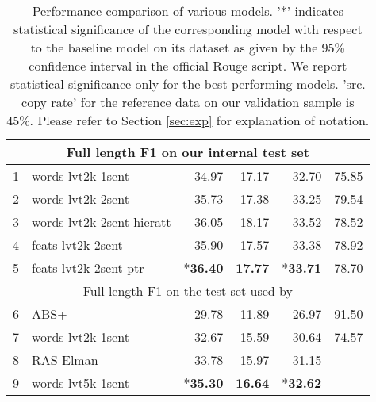 \begin{table*}
\begin{center}
{\begin{tabular}{|r|l|r|r|r|r|}
\hline
\hline
 \multicolumn{6}{|c|}{Full length F1 on our internal test set}  \\
\hline

1 & words-lvt2k-1sent      &    34.97              &    17.17                 &   32.70           &   75.85  \\
2 & words-lvt2k-2sent      &     35.73             &    17.38                 &   33.25           &    79.54 \\
3 & words-lvt2k-2sent-hieratt &   36.05          &    18.17                 &   33.52            &    78.52   \\
4 & feats-lvt2k-2sent             &   35.90           &    17.57                &   33.38         &      78.92          \\
5 & feats-lvt2k-2sent-ptr   &   *{\bf 36.40}            &    {\bf 17.77}                 &        *{\bf 33.71}   & 78.70  \\
\hline
\multicolumn{6}{|c|}{Full length F1 on the test set used by \cite{namas}}  \\
\hline
6 & ABS+ \cite{namas}  &    29.78      &      11.89             &     26.97        &   91.50       \\
7 & words-lvt2k-1sent & 32.67 &  15.59   & 30.64   &  74.57     \\
8 & RAS-Elman \cite{chopra} & 33.78 &  15.97  & 31.15 & \\
9 & words-lvt5k-1sent & *{\bf 35.30} & {\bf 16.64} & *{\bf 32.62} & \\
\hline
\end{tabular}
}
\end{center}
\vspace{-0.1in}
\caption{{\small Performance comparison of various models. '*' indicates statistical significance of the corresponding model with respect to the baseline model on its dataset as given by the 95\% confidence interval in the official Rouge script. We report statistical significance only for the best performing models. 'src. copy rate' for the reference data on our validation sample is 45\%. Please refer to Section \ref{sec:exp} for explanation of notation.}}
\label{tab:results}
\vspace{-0.2in}
\end{table*}


